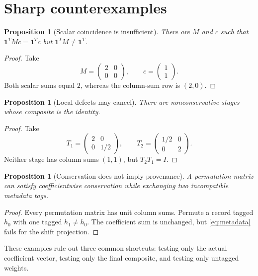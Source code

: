 \documentclass[11pt]{article}
\newtheorem{proposition}[theorem]{Proposition}
\theoremstyle{definition}
\theoremstyle{remark}
\newcommand{\one}{\mathbf 1}
\begin{document}
\section{Sharp counterexamples}

\begin{proposition}[Scalar coincidence is insufficient]
\label{prop:scalar}
There are \(M\) and \(c\) such that
\(\one^TMc=\one^Tc\) but \(\one^TM\ne\one^T\).
\end{proposition}

\begin{proof}
Take
\[
 M=\begin{pmatrix}2&0\\0&0\end{pmatrix},
 \qquad c=\begin{pmatrix}1\\1\end{pmatrix}.
\]
Both scalar sums equal \(2\), whereas the column-sum row is
\((2,0)\).
\end{proof}

\begin{proposition}[Local defects may cancel]
\label{prop:cancel}
There are nonconservative stages whose composite is the identity.
\end{proposition}

\begin{proof}
Take
\[
 T_1=\begin{pmatrix}2&0\\0&1/2\end{pmatrix},
 \qquad
 T_2=\begin{pmatrix}1/2&0\\0&2\end{pmatrix}.
\]
Neither stage has column sums \((1,1)\), but \(T_2T_1=I\).
\end{proof}

\begin{proposition}[Conservation does not imply provenance]
\label{prop:tags}
A permutation matrix can satisfy coefficientwise conservation while
exchanging two incompatible metadata tags.
\end{proposition}

\begin{proof}
Every permutation matrix has unit column sums.  Permute a record
tagged \(h_0\) with one tagged \(h_1\ne h_0\).  The coefficient sum is
unchanged, but \eqref{eq:metadata} fails for the shift projection.
\end{proof}

These examples rule out three common shortcuts: testing only the
actual coefficient vector, testing only the final composite, and
testing only untagged weights.
\end{document}
